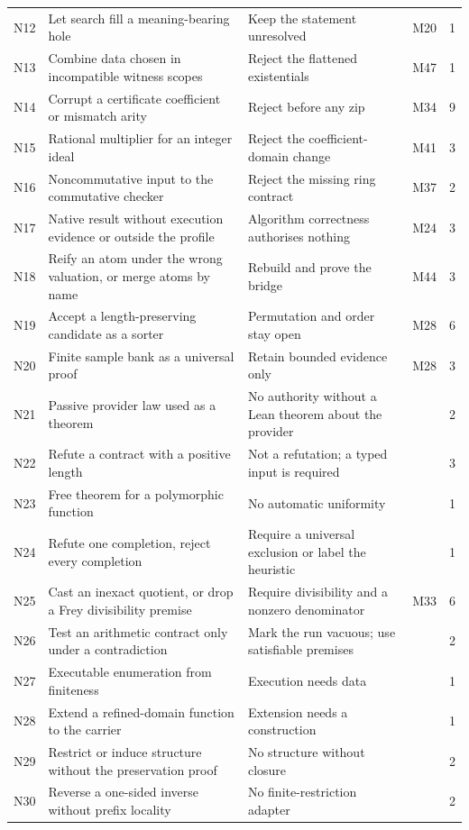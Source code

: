 {\begin{longtable}{@{}L{8mm}L{56mm}L{60mm}L{9mm}r@{}}
N12 & Let search fill a meaning-bearing hole & Keep the statement unresolved & M20 & 1\\
N13 & Combine data chosen in incompatible witness scopes & Reject the flattened existentials & M47 & 1\\
N14 & Corrupt a certificate coefficient or mismatch arity & Reject before any zip & M34 & 9\\
N15 & Rational multiplier for an integer ideal & Reject the coefficient-domain change & M41 & 3\\
N16 & Noncommutative input to the commutative checker & Reject the missing ring contract & M37 & 2\\
N17 & Native result without execution evidence or outside the profile & Algorithm correctness authorises nothing & M24 & 3\\
N18 & Reify an atom under the wrong valuation, or merge atoms by name & Rebuild and prove the bridge & M44 & 3\\
N19 & Accept a length-preserving candidate as a sorter & Permutation and order stay open & M28 & 6\\
N20 & Finite sample bank as a universal proof & Retain bounded evidence only & M28 & 3\\
N21 & Passive provider law used as a theorem & No authority without a Lean theorem about the provider & & 2\\
N22 & Refute a  contract with a positive length & Not a refutation; a typed input is required & & 3\\
N23 & Free theorem for a polymorphic function & No automatic uniformity & & 1\\
N24 & Refute one completion, reject every completion & Require a universal exclusion or label the heuristic & & 1\\
N25 & Cast an inexact quotient, or drop a Frey divisibility premise & Require divisibility and a nonzero denominator & M33 & 6\\
N26 & Test an arithmetic contract only under a contradiction & Mark the run vacuous; use satisfiable premises & & 2\\
N27 & Executable enumeration from  finiteness & Execution needs data & & 1\\
N28 & Extend a refined-domain function to the carrier & Extension needs a construction & & 1\\
N29 & Restrict or induce structure without the preservation proof & No structure without closure & & 2\\
N30 & Reverse a one-sided inverse without prefix locality & No finite-restriction adapter & & 2\\

\end{longtable}}
